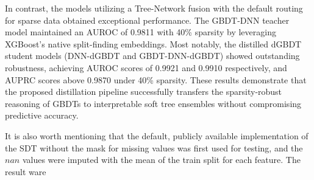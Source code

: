 In contrast, the models utilizing a Tree-Network fusion with the default routing for sparse data obtained exceptional performance. The GBDT-DNN teacher
model maintained an AUROC of 0.9811 with 40\% sparsity by leveraging XGBoost’s
native split-finding embeddings. Most notably, the distilled dGBDT student models
(DNN-dGBDT and GBDT-DNN-dGBDT) showed outstanding robustness, achieving
AUROC scores of 0.9921 and 0.9910 respectively, and AUPRC scores above 0.9870 under
40\% sparsity. These results demonstrate that the proposed distillation pipeline successfully transfers the sparsity-robust reasoning of GBDTs to interpretable soft tree ensembles
without compromising predictive accuracy.

It is also worth mentioning that the default, publicly available implementation of the SDT without the mask for missing values was first used for testing, and the $nan$ values were imputed with the mean of the train split for each feature. The result ware 



